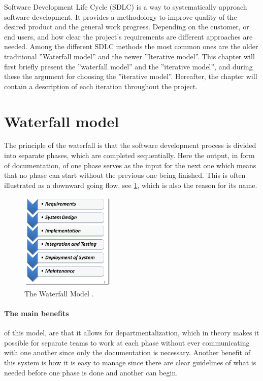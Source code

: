 Software Development Life Cycle (SDLC) is a way to systematically approach software development.
It provides a methodology to improve quality of the desired product and the general work progress. 
Depending on the customer, or end users, and how clear the project's requirements are different approaches are needed. 
Among the different SDLC methods the most common ones are the older traditional ''Waterfall model'' and the newer ''Iterative model''. \cite{SDLC-Toolsqa}
This chapter will first briefly present the ''waterfall model'' and the ''iterative model'', and during these the argument for choosing the ''iterative model''.
Hereafter, the chapter will contain a description of each iteration throughout the project.


\section{Waterfall model}\label{sec:WaterfallModel}
The principle of the waterfall \cite{Waterfall-Toolsqa} is that the software development process is divided into separate phases, which are completed sequentially.
Here the output, in form of documentation, of one phase serves as the input for the next one which means that no phase can start without the previous one being finished.
This is often illustrated as a downward going flow, see \cref{fig:Waterfall}, which is also the reason for its name.

\begin{figure}[H]
	\centering
	\includegraphics[width=0.4\textwidth]{billeder/WaterFall-Model.png}
	\caption{The Waterfall Model \cite{Waterfall-Toolsqa}.}\label{fig:Waterfall}
\end{figure}

\paragraph{The main benefits} of this model, are that it allows for departmentalization, which in theory makes it possible for separate teams to work at each phase without ever communicating with one another since only the documentation is necessary.
Another benefit of this system is how it is easy to manage since there are clear guidelines of what is needed before one phase is done and another can begin.

